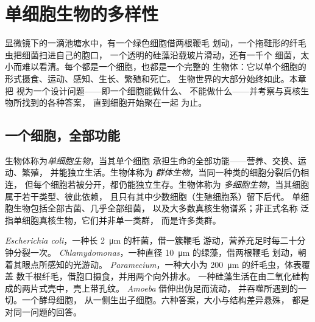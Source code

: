 \chapter{单细胞生物的多样性}\label{ch:b2:unicellular-diversity}

显微镜下的一滴池塘水中，有一个绿色细胞借两根鞭毛
划动，一个拖鞋形的纤毛虫把细菌扫进自己的胞口，
一个透明的硅藻沿载玻片滑动，还有一千个
细菌，太小而难以看清。每个都是一个细胞，也都是一个完整的
生物体：它以单个细胞的形式摄食、运动、感知、生长、繁殖和死亡。
生物世界的大部分始终如此。本章把
视为一个设计问题——即一个细胞能做什么、
不能做什么——并考察与真核生物所找到的各种答案，
直到细胞开始聚在一起
为止。

\section{一个细胞，全部功能}

\begin{definition}\label{def:b2:unicellular-diversity:unicellular}
生物体称为\emph{单细胞生物}，当其单个细胞
承担生命的全部功能——营养、交换、运动、繁殖，
并能独立生活。生物体称为
\emph{群体生物}，当同一种类的细胞分裂后仍相连，
但每个细胞若被分开，都仍能独立生存。生物体称为
\emph{多细胞生物}，当其细胞属于若干类型、彼此依赖，
且只有其中少数细胞（生殖细胞系）留下后代。
单细胞生物包括全部古菌、几乎全部细菌，
以及大多数真核生物谱系；非正式名称\emph{}
泛指单细胞真核生物，它们并非单一类群，
而是许多类群。
\end{definition}

\begin{example}[一滴水中的六种居民]\label{ex:b2:unicellular-diversity:drop}
\emph{Escherichia coli}，一种长 \qty{2}{\micro m} 的杆菌，借一簇鞭毛
游动，营养充足时每二十分钟分裂一次。
\emph{Chlamydomonas}，一种直径 \qty{10}{\micro m} 的绿藻，借两根鞭毛
划动，朝着其眼点所感知的光游动。
\emph{Paramecium}，一种大小为 \qty{200}{\micro m} 的纤毛虫，体表覆盖
数千根纤毛，借胞口摄食，并用两个向外排水。
一种硅藻生活在由二氧化硅构成的两片式壳中，壳上带孔纹。
\emph{Amoeba} 借伸出伪足而流动，
并吞噬所遇到的一切。一个酵母细胞，
从一侧生出子细胞。六种答案，大小与结构差异悬殊，
都是对同一问题的回答。
\end{example}

